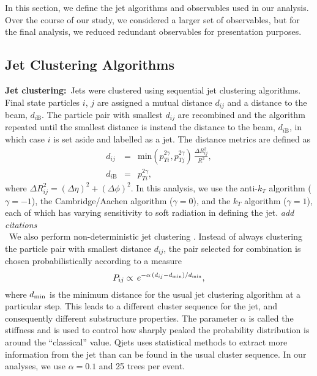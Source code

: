 In this section, we define the jet algorithms and observables used in our analysis. Over the course of our study, we considered a larger set of observables, but for the final analysis, we reduced redundant observables for presentation purposes.

\subsection{Jet Clustering Algorithms}

{\bf Jet clustering:}~Jets were clustered using sequential jet clustering algorithms. Final state particles $i$, $j$ are assigned a mutual distance $d_{ij}$ and a distance to the beam, $d_{i\mathrm{B}}$. The particle pair with smallest $d_{ij}$ are  recombined and the algorithm repeated until the smallest distance is instead the distance to the beam, $d_{i\mathrm{B}}$, in which case $i$ is set aside and labelled as a jet. The distance metrics are defined as
%
\begin{eqnarray}
d_{ij} &=& \mathrm{min}(p_{Ti}^{2\gamma},p_{Tj}^{2\gamma})\,\frac{\Delta R_{ij}^2}{R^2},\\
d_{i\mathrm{B}} &=& p_{Ti}^{2\gamma},
\end{eqnarray}
%
where $\Delta R_{ij}^2=(\Delta \eta)^2+(\Delta\phi)^2$. In this analysis, we use the anti-$k_T$ algorithm ($\gamma=-1$), the Cambridge/Aachen algorithm ($\gamma=0$), and the $k_T$ algorithm ($\gamma=1$), each of which has varying sensitivity to soft radiation in defining the jet. \emph{add citations} \\

~We also perform non-deterministic jet clustering  \cite{?}. Instead of always clustering the particle pair with smallest distance $d_{ij}$, the pair selected for combination is chosen probabilistically according to a measure
%
\begin{equation}
P_{ij} \propto \,e^{-\alpha \,(d_{ij}-d_{\rm min})/d_{\rm min}},
\end{equation}
%
where $d_{\rm min}$ is the minimum distance for the usual jet clustering algorithm at a particular step. This leads to a different cluster sequence for the jet, and consequently different substructure properties. The parameter $\alpha$ is called the stiffness and is used to control how sharply peaked the probability distribution is around the ``classical'' value. Qjets uses statistical methods to extract more information from the jet than can be found in the usual cluster sequence. In our analyses, we use $\alpha=0.1$ and 25 trees per event.

